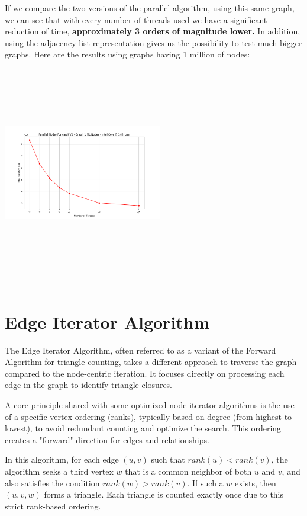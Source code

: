 \documentclass{aes2e}
\begin{document}
If we compare the two versions of the parallel algorithm, using this same graph, we can see that with every number of threads used we have a significant reduction of time, \textbf{approximately 3 orders of magnitude lower.}
In addition, using the adjacency list representation gives us the possibility to test much bigger graphs. Here are the results using graphs having 1 million of nodes:
\includegraphics[width=0.52\textwidth, height=10cm, keepaspectratio]{charts/Parallel Node (Forward) V2 - Graph 1 ML Nodes - Intel Core i7 14th gen.png}


\section{Edge Iterator Algorithm}

The Edge Iterator Algorithm, often referred to as a variant of the Forward Algorithm for triangle counting, takes a different approach to traverse the graph compared to the node-centric iteration. It focuses directly on processing each edge in the graph to identify triangle closures.

A core principle shared with some optimized node iterator algorithms is the use of a specific vertex ordering (ranks), typically based on degree (from highest to lowest), to avoid redundant counting and optimize the search. This ordering creates a "forward" direction for edges and relationships.

In this algorithm, for each edge $(u, v)$ such that $rank(u) < rank(v)$, the algorithm seeks a third vertex $w$ that is a common neighbor of both $u$ and $v$, and also satisfies the condition $rank(w) > rank(v)$. If such a $w$ exists, then $(u, v, w)$ forms a triangle. Each triangle is counted exactly once due to this strict rank-based ordering.
\end{document}
